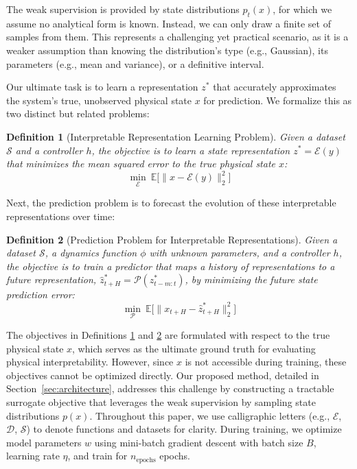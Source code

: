 \documentclass[nonacm,sigconf]{acmart}
\newtheorem{definition}{Definition}
\begin{document}
The weak supervision is provided by state distributions \( p_t(x) \), for which we assume no analytical form is known. Instead, we can only draw a finite set of samples from them. This represents a challenging yet practical scenario, as it is a weaker assumption than knowing the distribution's type (e.g., Gaussian), its parameters (e.g., mean and variance), or a definitive interval. 

Our ultimate task is to learn a representation \( z^* \) that accurately approximates the system’s true, unobserved physical state \( x \) for prediction. We formalize this as two distinct but related problems:

\begin{definition}[Interpretable Representation Learning Problem]
Given a dataset \( \mathcal{S} \) and a controller \( h \), the objective is to \emph{learn a state representation} \( z^* = \mathcal{E}(y) \) that minimizes the mean squared error to the true physical state \( x \):
\begin{equation}
\min_{\mathcal{E}} \ \mathbb{E} \big[ \| x - \mathcal{E}(y) \|_2^2 \big]
\end{equation}
\label{def:repprob}
\end{definition}

Next, the prediction problem is to forecast the evolution of these interpretable representations over time:

\begin{definition}[Prediction Problem for Interpretable Representations]
Given a dataset \( \mathcal{S} \), a dynamics function \( \phi \) with unknown parameters, and a controller \( h \), the objective is to \emph{train a predictor} that maps a history of representations to a future representation, \( \hat{z}^*_{t+H} = \mathcal{P}(z^*_{t-m:t}) \), by minimizing the future state prediction error:
\begin{equation}
\min_{\mathcal{P}} \ \mathbb{E} \big[ \| x_{t+H} - \hat{z}^*_{t+H} \|_2^2 \big]
\end{equation}
\label{def:predprob}
\end{definition}

The objectives in Definitions \ref{def:repprob} and \ref{def:predprob} are formulated with respect to the true physical state \( x \), which serves as the ultimate ground truth for evaluating physical interpretability. However, since \( x \) is not accessible during training, these objectives cannot be optimized directly. Our proposed method, detailed in Section~\ref{sec:architecture}, addresses this challenge by constructing a tractable surrogate objective that leverages the weak supervision by sampling state distributions \( p(x) \). Throughout this paper, we use calligraphic letters (e.g., $\mathcal{E}$, $\mathcal{D}$, $\mathcal{S}$) to denote functions and datasets for clarity. During training, we optimize model parameters $w$ using mini-batch gradient descent with batch size $B$, learning rate $\eta$, and train for $n_{\text{epochs}}$ epochs.
\end{document}
